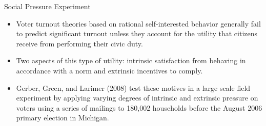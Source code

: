 \documentclass{beamer}
\numberwithin{equation}{section}
\begin{document}
\begin{frame}{Social Pressure Experiment}
\small
\begin{itemize}
\itemsep1pt\parskip0pt
\item
  Voter turnout theories based on rational self-interested behavior
  generally fail to predict significant turnout unless they account for
  the utility that citizens receive from performing their civic duty.\medskip
  
\item
  Two aspects of this type of utility: intrinsic satisfaction from
  behaving in accordance with a norm and extrinsic incentives to comply.\medskip
  
\item
  Gerber, Green, and Larimer (2008) test these motives in a large
  scale field experiment by applying varying degrees of intrinsic and extrinsic
  pressure on voters using a series of mailings to 180,002 households
  before the August 2006 primary election in Michigan.
\end{itemize}

\end{frame}
\end{document}
